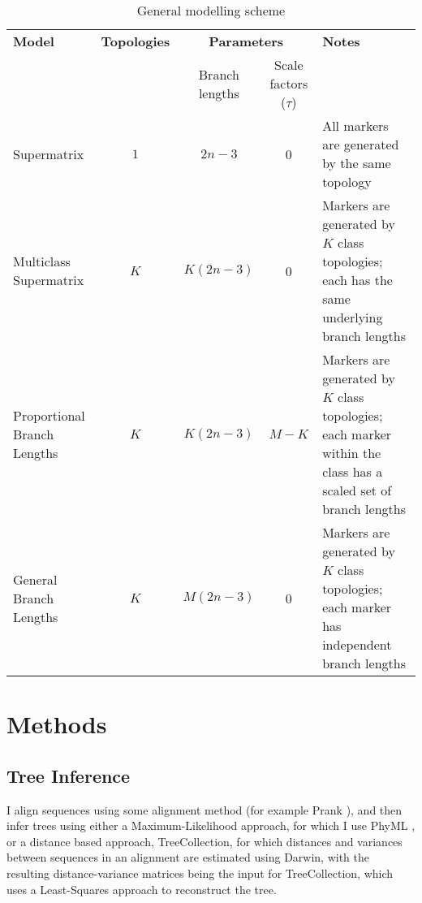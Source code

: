 \documentclass[11pt]{article}
\newcommand{\head}[1]{\textnormal{\textbf{#1}}}
\begin{document}
\begin{table}[!htbp]
\begin{tabularx}{\linewidth}{XcccX}
\toprule[1.5pt]
\head{Model} & \head{Topologies} & \multicolumn{2}{c}{\head{Parameters}} & \head{Notes}\\
 & & Branch lengths & Scale factors ($\tau$) & \\
\midrule
Supermatrix 	& $1$ & $2n-3$ &	0 & All markers are generated by the same topology\\ 
Multiclass Supermatrix & $K$ & $K(2n-3)$ &	 0 & Markers are generated by $K$ class topologies; each has the same underlying branch lengths\\ 
Proportional Branch Lengths & $K$ & 	$K(2n-3)$ &	$M-K$ & Markers are generated by $K$ class topologies; each marker within the class has a scaled set of branch lengths \\ 
General Branch Lengths & $K$ & $M(2n-3)$	& 0 & Markers are generated by $K$ class topologies; each marker has independent branch lengths\\ 
\bottomrule[1.2pt]
\end{tabularx}
\caption{General modelling scheme}\label{tab:table}
\end{table}


\section{Methods}

\subsection{Tree Inference}
I align sequences using some alignment method (for example Prank \citep{Loytynoja:2005cb}), and then infer trees using either a Maximum-Likelihood approach, for which I use PhyML \citep{Guindon:2010gf}, or a distance based approach, TreeCollection, for which distances and variances between sequences in an alignment are estimated using Darwin, with the resulting distance-variance matrices being the input for TreeCollection, which uses a Least-Squares approach to reconstruct the tree.

\end{document}
